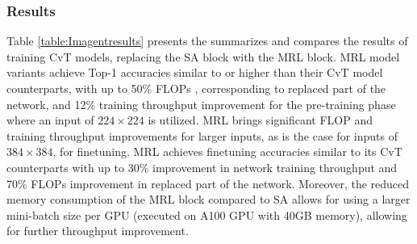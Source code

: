 \documentclass{article}
\begin{document}
\subsubsection{Results}

Table \ref{table:Imagentresults} presents the summarizes and compares the results of training CvT models, replacing the SA block with the MRL block. MRL model variants achieve Top-1 accuracies similar to or higher than their CvT model counterparts, with up to 50\% FLOPs , corresponding to replaced part of the network, and 12\% training throughput improvement for the pre-training phase where an input of $224 \times 224$ is utilized. MRL brings significant FLOP and training throughput improvements for larger inputs, as is the case for inputs of $384 \times 384$, for finetuning. MRL achieves finetuning accuracies similar to its CvT counterparts with up to 30\% improvement in network training throughput and 70\% FLOPs improvement in replaced part of the network. Moreover, the reduced memory consumption of the MRL block compared to SA allows for using a larger mini-batch size per GPU (executed on A100 GPU with 40GB memory), allowing for further throughput improvement. 
\end{document}

